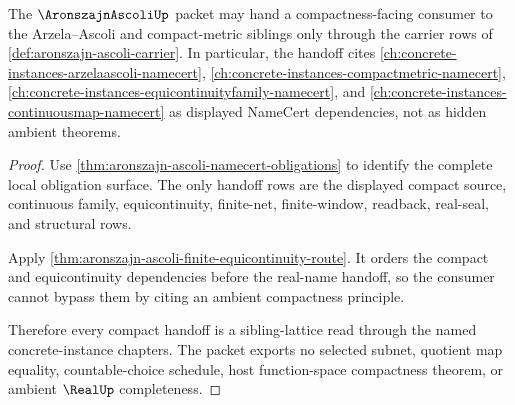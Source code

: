 \begin{theorem}
\label{thm:aronszajn-ascoli-compact-handoff}
The $\AronszajnAscoliUp$ packet may hand a compactness-facing consumer to the Arzela--Ascoli and compact-metric siblings only through the carrier rows of \autoref{def:aronszajn-ascoli-carrier}. In particular, the handoff cites \autoref{ch:concrete-instances-arzelaascoli-namecert}, \autoref{ch:concrete-instances-compactmetric-namecert}, \autoref{ch:concrete-instances-equicontinuityfamily-namecert}, and \autoref{ch:concrete-instances-continuousmap-namecert} as displayed NameCert dependencies, not as hidden ambient theorems.
\end{theorem}
\begin{proof}
Use \autoref{thm:aronszajn-ascoli-namecert-obligations} to identify the complete local obligation surface. The only handoff rows are the displayed compact source, continuous family, equicontinuity, finite-net, finite-window, readback, real-seal, and structural rows.

Apply \autoref{thm:aronszajn-ascoli-finite-equicontinuity-route}. It orders the compact and equicontinuity dependencies before the real-name handoff, so the consumer cannot bypass them by citing an ambient compactness principle.

Therefore every compact handoff is a sibling-lattice read through the named concrete-instance chapters. The packet exports no selected subnet, quotient map equality, countable-choice schedule, host function-space compactness theorem, or ambient $\RealUp$ completeness.
\end{proof}


\begin{closurestatus}{\AronszajnAscoliUp}
  \theoryclosure{\seedClosure}
  \formalstatus{\unformalizedV}
\end{closurestatus}
